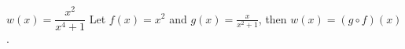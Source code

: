 {$w(x) = \dfrac{x^2}{x^4+1}$}
{Let $f(x) = x^2$ and $g(x) = \frac{x}{x^2+1}$, then  $w(x) =(g\circ f)(x)$.}